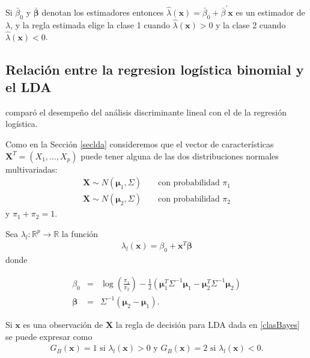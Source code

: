 \documentclass{report}
\begin{document}
Si  $ \bar{\beta}_0$ y $ \bar{\boldsymbol{\beta}}$ denotan los estimadores entonces $\widehat{\lambda}(\mathbf{x})=\bar{\beta}_0+\bar{\beta}^{\prime} \mathbf{x}$ es un estimador de $\lambda$,  y la regla estimada elige la clase 1 cuando $\widehat{\lambda}(\mathbf{x})>0$ y la clase 2 cuando $\widehat{\lambda} (\mathbf{x})<0$.  



\subsection{Relación entre la regresion logística binomial y el LDA}


  \cite{efron1975}  comparó el desempeño del análisis discriminante lineal con el de la regresión logística. 
  

 

Como en la Sección \ref{seclda} consideremos que el vector de características $\mathbf{X}^T=(X_1,\ldots, X_p)$ puede tener alguna de las dos distribuciones normales multivariadas:
\begin{eqnarray}\label{modelonormalclases}
\mathbf{X}\sim N(\boldsymbol{\mu}_1,\Sigma ) && \text{ con probabilidad } \pi_1\\
\mathbf{X}\sim N(\boldsymbol{\mu}_2,\Sigma ) && \text{ con probabilidad } \pi_2 \nonumber 
\end{eqnarray}
y $\pi_1+\pi_2=1$. 


Sea $\lambda_l: \mathbb{R}^p\rightarrow  \mathbb{R}$ la función 
\begin{eqnarray*}
\lambda_l(\mathbf{x})=\beta_0+\mathbf{x}^T \boldsymbol{\beta}
\end{eqnarray*}
donde 

\begin{eqnarray*}
\beta_0 &=&\log \left( \frac{\pi_1}{\pi_2}\right) -\frac 12 \left( \boldsymbol{\mu}_1^T \Sigma^{-1} \boldsymbol{\mu}_1- \boldsymbol{\mu}_2^T \Sigma^{-1} \boldsymbol{\mu}_2 \right)\\
\boldsymbol{\beta} &=&  \Sigma^{-1}(\boldsymbol{\mu}_2-\boldsymbol{\mu}_1).
\end{eqnarray*}






Si $\mathbf{x}$ es una observación de  $\mathbf{X}$ la regla de decisión para LDA dada en \eqref{clasBayes} se puede expresar como 
\begin{eqnarray}\label{clasBayes2}
	G_B(\mathbf{x})=1 \text { si } \lambda_l(\mathbf{x})>0   \text { y } 	G_B(\mathbf{x})=2  \text { si }  \lambda_l(\mathbf{x})<0. 
\end{eqnarray}
\end{document}
